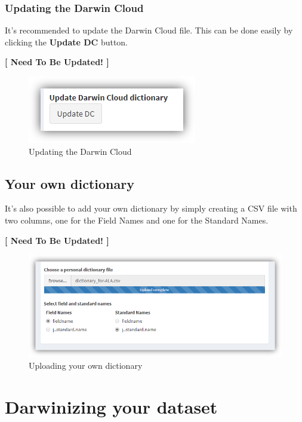 \documentclass[]{book}
\theoremstyle{definition}
\theoremstyle{definition}
\theoremstyle{definition}
\theoremstyle{remark}
\begin{document}
\subsubsection*{Updating the Darwin
Cloud}\label{updating-the-darwin-cloud}

It's recommended to update the Darwin Cloud file. This can be done
easily by clicking the \textbf{Update DC} button.

\textbf{{{[} Need To Be Updated! {]}}}

\begin{figure}
\centering
\includegraphics{img/bdDwC_update-DC.png}
\caption{Updating the Darwin Cloud}
\end{figure}

\subsection{Your own dictionary}\label{your-own-dictionary}

It's also possible to add your own dictionary by simply creating a CSV
file with two columns, one for the Field Names and one for the Standard
Names.

\textbf{{{[} Need To Be Updated! {]}}}

\begin{figure}
\centering
\includegraphics{img/bdDwC_personal_dictionary.png}
\caption{Uploading your own dictionary}
\end{figure}

\section{Darwinizing your dataset}\label{darwinizing-your-dataset}
\end{document}
